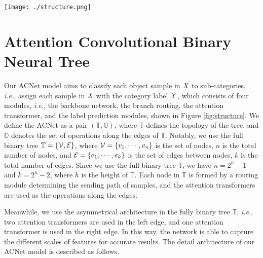 \documentclass[10pt,twocolumn,letterpaper]{article}
\def\ie{{\em i.e.}}
\begin{document}
\begin{figure*}[t]
\centering
\texttt{[image: ./structure.png]}
\vspace{-4mm}
\caption{The overview of our ACNet model, formed by (a) the backbone network module, (b) the branch routing module, (c) the attention transformer module, and (d) the label prediction module. We show an example image in \textit{Fish\_Crow}. Best visualization in color.}
\label{fig:structure}
\end{figure*}

\section{Attention Convolutional Binary Neural Tree}
Our ACNet model aims to classify each object sample in ${\it X}$ to sub-categories, \ie, assign each sample in ${\it X}$ with the category label ${\it Y}$, which consists of four modules, \ie, the backbone network, the branch routing, the attention transformer, and the label prediction modules, shown in Figure \ref{fig:structure}. We define the ACNet as a pair $(\mathbb{T}, \mathbb{O})$, where $\mathbb{T}$ defines the topology of the tree, and $\mathbb{O}$ denotes the set of operations along the edges of $\mathbb{T}$. Notably, we use the full binary tree $\mathbb{T}=\{{\cal V}, {\cal E}\}$, where ${\cal V}=\{v_1, \cdots, v_{n}\}$ is the set of nodes, $n$ is the total number of nodes, and ${\cal E}=\{e_1, \cdots, e_{k}\}$ is the set of edges between nodes, $k$ is the total number of edges. Since we use the full binary tree $\mathbb{T}$, we have $n=2^{h}-1$ and $k=2^{h}-2$, where $h$ is the height of $\mathbb{T}$. Each node in $\mathbb{T}$ is formed by a routing module determining the sending path of samples, and the attention transformers are used as the operations along the edges.

Meanwhile, we use the asymmetrical architecture in the fully binary tree $\mathbb{T}$, \ie, two attention transformers are used in the left edge, and one attention transformer is used in the right edge. In this way, the network is able to capture the different scales of features for accurate results. The detail architecture of our ACNet model is described as follows.
\end{document}
